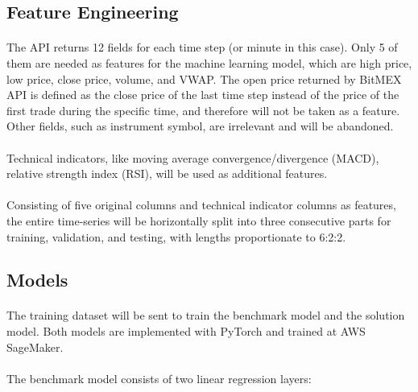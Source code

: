 \documentclass[12pt, letterpaper]{article}
\begin{document}
\subsection{Feature Engineering}

\paragraph{}
The API returns 12 fields for each time step (or minute in this case). Only 5 of them are needed as features for the machine learning model, which are high price, low price, close price, volume, and VWAP\@. The open price returned by BitMEX API is defined as the close price of the last time step instead of the price of the first trade during the specific time, and therefore will not be taken as a feature. Other fields, such as instrument symbol, are irrelevant and will be abandoned.

\paragraph{}
Technical indicators, like moving average convergence/divergence (MACD), relative strength index (RSI), will be used as additional features.

\paragraph{}
Consisting of five original columns and technical indicator columns as features, the entire time-series will be horizontally split into three consecutive parts for training, validation, and testing, with lengths proportionate to 6:2:2.

\subsection{Models}

\paragraph{}
The training dataset will be sent to train the benchmark model and the solution model. Both models are implemented with PyTorch and trained at AWS SageMaker.

\paragraph{}
The benchmark model consists of two linear regression layers:
\end{document}
